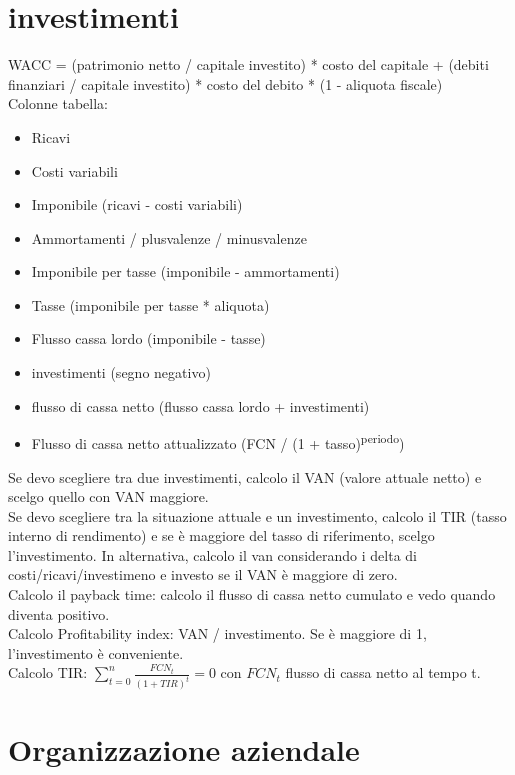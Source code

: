 \documentclass{scrreprt}
\begin{document}
\section*{investimenti}
WACC = (patrimonio netto / capitale investito) * costo del capitale + (debiti finanziari / capitale investito) * costo del debito * (1 - aliquota fiscale)\\
Colonne tabella:
\begin{itemize}
	\item Ricavi
	\item Costi variabili
	\item Imponibile (ricavi - costi variabili)
	\item Ammortamenti / plusvalenze / minusvalenze
	\item Imponibile per tasse (imponibile - ammortamenti)
	\item Tasse (imponibile per tasse * aliquota)
	\item Flusso cassa lordo (imponibile - tasse)
	\item investimenti (segno negativo)
	\item flusso di cassa netto (flusso cassa lordo + investimenti)
	\item Flusso di cassa netto attualizzato (FCN / (1 + tasso)\textsuperscript{periodo})
\end{itemize}

Se devo scegliere tra due investimenti, calcolo il VAN (valore attuale netto) e scelgo quello con VAN maggiore.\\
Se devo scegliere tra la situazione attuale e un investimento, calcolo il TIR (tasso interno di rendimento) e se è maggiore del tasso di riferimento, scelgo l'investimento. In alternativa, calcolo il van considerando i delta di costi/ricavi/investimeno e investo se il VAN è maggiore di zero.\\

Calcolo il payback time: calcolo il flusso di cassa netto cumulato e vedo quando diventa positivo.\\
Calcolo Profitability index: VAN / investimento. Se è maggiore di 1, l'investimento è conveniente.\\
Calcolo TIR: $\sum_{t=0}^{n} \frac{FCN_t}{(1 + TIR)^t} = 0$ con $FCN_t$ flusso di cassa netto al tempo t.\\


\section*{Organizzazione aziendale}
\end{document}
